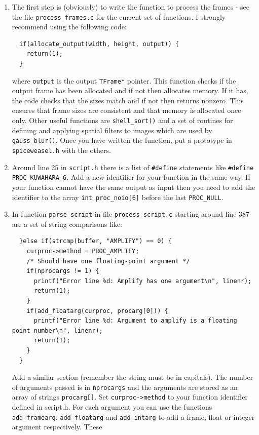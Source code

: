 \documentclass[12pt, a4paper]{article}
\begin{document}
\begin{enumerate}
\item The first step is (obviously) to write the function to process the frames - see
the file \texttt{process\_frames.c} for the current set of functions. I strongly
recommend using the following code: 
\begin{verbatim}
  if(allocate_output(width, height, output)) {
    return(1);
  }
\end{verbatim}
where \texttt{output} is the output \texttt{TFrame*} pointer. This function checks
if the output frame has been allocated and if not then allocates memory. If it has,
the code checks that the sizes match and if not then returns nonzero. This ensures
that frame sizes are consistent and that memory is allocated once only. Other useful
functions are \texttt{shell\_sort()} and a set of routines for defining and applying
spatial filters to images which are used by \texttt{gauss\_blur()}.
Once you have written the function, put a prototype in \texttt{spiceweasel.h} with
the others.
\item Around line 25 in \texttt{script.h} there is a list of \texttt{\#define}
  statements like \texttt{\#define PROC\_KUWAHARA 6}. Add a new identifier for your function
  in the same way.
  If your function cannot have the same output as input then you need to add the identifier to the
  array \texttt{int proc\_noio[6]} before the last \texttt{PROC\_NULL}.
\item In function \texttt{parse\_script} in file \texttt{process\_script.c} starting around
  line 387 are a set of string comparisons like:
\begin{verbatim}
  }else if(strcmp(buffer, "AMPLIFY") == 0) {
    curproc->method = PROC_AMPLIFY;
    /* Should have one floating-point argument */
    if(nprocargs != 1) {
      printf("Error line %d: Amplify has one argument\n", linenr);
      return(1);
    }
    if(add_floatarg(curproc, procarg[0])) {
      printf("Error line %d: Argument to amplify is a floating point number\n", linenr);
      return(1);
    }
  }
\end{verbatim}
  Add a similar section (remember the string must be in capitals). The number of
  arguments passed is in \texttt{nprocargs} and the arguments are stored as an array
  of strings \texttt{procarg[]}.
  Set \texttt{curproc->method} to your function identifier defined in script.h. For each
  argument you can use the functions \texttt{add\_framearg}, \texttt{add\_floatarg}
  and \texttt{add\_intarg} to add a frame, float or integer argument respectively. These

\end{enumerate}
\end{document}
